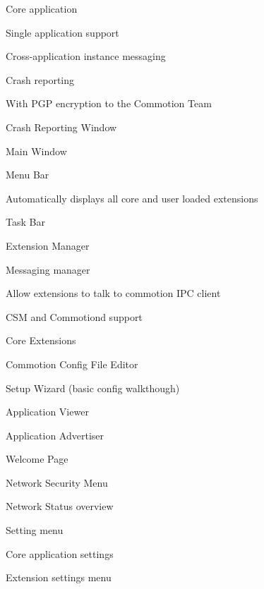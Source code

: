 \begin{DoxyItemize}
\item Core application
\begin{DoxyItemize}
\item Single application support
\item Cross-\/application instance messaging
\item Crash reporting
\item With P\+G\+P encryption to the Commotion Team
\begin{DoxyItemize}
\item Crash Reporting Window
\end{DoxyItemize}
\end{DoxyItemize}
\item Main Window
\item Menu Bar
\begin{DoxyItemize}
\item Automatically displays all core and user loaded extensions
\end{DoxyItemize}
\item Task Bar
\item Extension Manager
\item Messaging manager
\begin{DoxyItemize}
\item Allow extensions to talk to commotion I\+P\+C client
\begin{DoxyItemize}
\item C\+S\+M and Commotiond support
\end{DoxyItemize}
\end{DoxyItemize}
\item Core Extensions
\begin{DoxyItemize}
\item Commotion Config File Editor
\item Setup Wizard (basic config walkthough)
\item Application Viewer
\item Application Advertiser
\item Welcome Page
\end{DoxyItemize}
\item Network Security Menu
\item Network Status overview
\item Setting menu
\item Core application settings
\item Extension settings menu
\begin{DoxyItemize}

\end{DoxyItemize}
\end{DoxyItemize}
